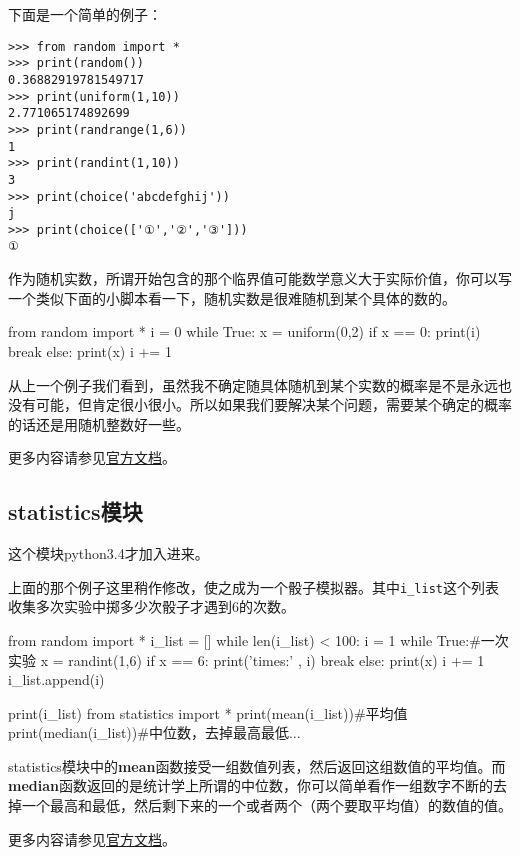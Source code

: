 \documentclass[12pt,oneside]{book}
\begin{document}
\begin{common-format}
下面是一个简单的例子：
\begin{Verbatim}
>>> from random import *
>>> print(random())
0.36882919781549717
>>> print(uniform(1,10))
2.771065174892699
>>> print(randrange(1,6))
1
>>> print(randint(1,10))
3
>>> print(choice('abcdefghij'))
j
>>> print(choice(['①','②','③']))
①
\end{Verbatim}



作为随机实数，所谓开始包含的那个临界值可能数学意义大于实际价值，你可以写一个类似下面的小脚本看一下，随机实数是很难随机到某个具体的数的。
\begin{tcbpython}[]
from random import *
i = 0
while True:
    x = uniform(0,2)
    if x == 0:
        print(i)
        break
    else:
        print(x)
        i += 1
\end{tcbpython}

从上一个例子我们看到，虽然我不确定随具体随机到某个实数的概率是不是永远也没有可能，但肯定很小很小。所以如果我们要解决某个问题，需要某个确定的概率的话还是用随机整数好一些。


\begin{large}
更多内容请参见\href{http://docs.python.org/3.4/library/random.html}{官方文档}。
\end{large}


\subsection{statistics模块}
这个模块python3.4才加入进来。

上面的那个例子这里稍作修改，使之成为一个骰子模拟器。其中\verb+i_list+这个列表收集多次实验中掷多少次骰子才遇到6的次数。
\begin{tcbpython}[]
from random import *
i_list = []
while len(i_list) < 100:
    i = 1
    while True:#一次实验
        x = randint(1,6)
        if x == 6:
            print('times:' , i)
            break
        else:
            print(x)
            i += 1
    i_list.append(i)

print(i_list)
from statistics import *
print(mean(i_list))#平均值
print(median(i_list))#中位数，去掉最高最低...
\end{tcbpython}

statistics模块中的\textbf{mean}函数接受一组数值列表，然后返回这组数值的平均值。而\textbf{median}函数返回的是统计学上所谓的中位数，你可以简单看作一组数字不断的去掉一个最高和最低，然后剩下来的一个或者两个（两个要取平均值）的数值的值。


\begin{large}
更多内容请参见\href{https://docs.python.org/3/library/statistics.html}{官方文档}。
\end{large}



\end{common-format}
\end{document}
